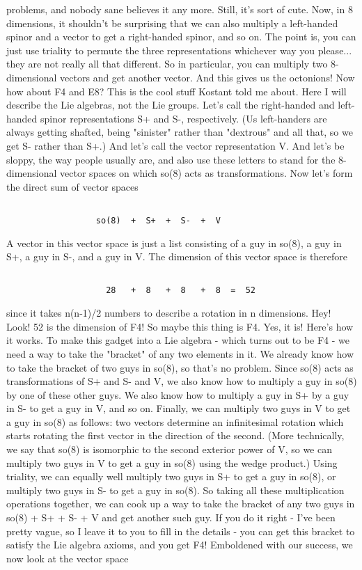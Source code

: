 problems, and nobody sane believes it any more.   Still, it's sort of
cute.
Now, in 8 dimensions, it shouldn't be surprising that we can also 
multiply a left-handed spinor and a vector to get a right-handed 
spinor, and so on.  The point is, you can just use triality to permute the
three representations whichever way you please... they are not really
all that different.  
So in particular, you can multiply two 8-dimensional vectors and get 
another vector.  And this gives us the octonions!  
Now how about F4 and E8?  This is the cool stuff Kostant told me about.
Here I will describe the Lie algebras, not the Lie groups.  
Let's call the right-handed and left-handed spinor representations
S+ and S-, respectively.  (Us left-handers are always getting shafted,
being "sinister" rather than "dextrous" and all that, so we get S-
rather than S+.)  And let's call the vector representation V.   And let's
be sloppy, the way people usually are, and also use these letters to stand 
for the 8-dimensional vector spaces on which so(8) acts as transformations.
Now let's form the direct sum of vector spaces

\begin{verbatim}

                  so(8)  +  S+  +  S-  +  V
\end{verbatim}
    
A vector in this vector space is just a list consisting of a 
guy in so(8), a guy in S+, a guy in S-, and a guy in V.  The
dimension of this vector space is therefore

\begin{verbatim}

                    28   +  8   +  8   +  8  =  52
\end{verbatim}
    
since it takes n(n-1)/2 numbers to describe a rotation in n
dimensions.  Hey!  Look!  52 is the dimension of F4!  So maybe
this thing is F4.  
Yes, it is!   Here's how it works.  To make this gadget
into a Lie algebra - which turns out to be F4 - we need a way
to take the "bracket" of any two elements in it.  We already
know how to take the bracket of two guys in so(8), so that's
no problem.  Since so(8) acts as transformations of S+ and
S- and V, we also know how to multiply a guy in so(8) by
one of these other guys.  We also know how to multiply a
guy in S+ by a guy in S- to get a guy in V, and so on.  Finally,
we can multiply two guys in V to get a guy in so(8) as follows:
two vectors determine an infinitesimal rotation which starts
rotating the first vector in the direction of the second.  
(More technically, we say that so(8) is isomorphic to the 
second exterior power of V, so we can multiply two guys in
V to get a guy in so(8) using the wedge product.)  Using
triality, we can equally well multiply two guys in S+ to
get a guy in so(8), or multiply two guys in S- to get a guy
in so(8).  
So taking all these multiplication operations together, we
can cook up a way to take the bracket of any two guys in 
so(8) + S+ + S- + V and get another such guy.  If you do it
right - I've been pretty vague, so I leave it to you to fill 
in the details - you can get this bracket to satisfy the Lie 
algebra axioms, and you get F4!
Emboldened with our success, we now look at the vector space

